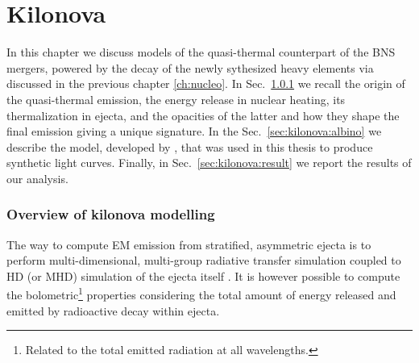 
\chapter{Kilonova} \label{ch:kilonova} 

In this chapter we discuss models of the quasi-thermal counterpart 
of the \ac{BNS} mergers, powered by the decay of the newly sythesized heavy 
elements via \rproc{} \nuc{} discussed in the previous chapter \ref{ch:nucleo}.
%
In Sec.~\ref{sec:intro:kilonova} we recall the origin of the quasi-thermal emission, 
the energy release in nuclear heating, its thermalization in ejecta, and the 
opacities of the latter and how they shape the final emission giving a unique 
signature. 
%
In the Sec.~\ref{sec:kilonova:albino} we describe the model, 
developed by \cite{Perego:2017wtu}, that was used in this thesis to 
produce synthetic light curves. Finally, in Sec.~\ref{sec:kilonova:result} 
we report the results of our analysis.





\subsection{Overview of kilonova modelling} \label{sec:intro:kilonova}

The way to compute \ac{EM} emission from stratified, asymmetric ejecta is to perform 
multi-dimensional, multi-group radiative transfer simulation coupled to \ac{HD} (or \ac{MHD}) 
simulation of the ejecta itself \citep[\eg][]{Bulla:2019muo}.
%
It is however possible to compute the bolometric\footnote{
    Related to the total emitted radiation at all wavelengths. 
} properties considering the total amount 
of energy released and emitted by radioactive decay within ejecta. 

